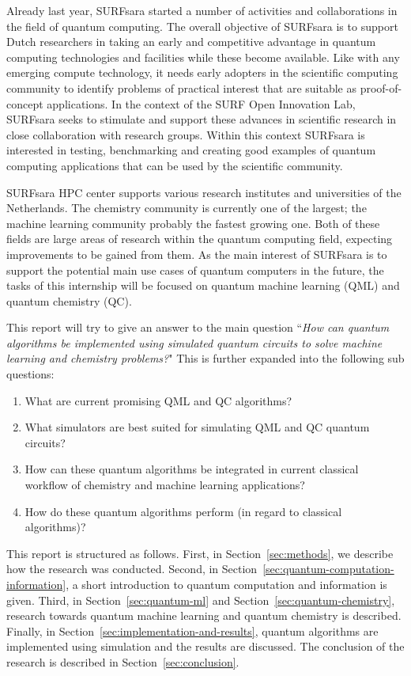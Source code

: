 \documentclass[a4paper,10pt]{article}
\begin{document}
Already last year, SURFsara started a number of activities and collaborations in the field of quantum computing.
The overall objective of SURFsara is to support Dutch researchers in taking an early and competitive advantage in quantum computing technologies and facilities while these become available.
Like with any emerging compute technology, it needs early adopters in the scientific computing community to identify problems of practical interest that are suitable as proof-of-concept applications.
In the context of the SURF Open Innovation Lab, SURFsara seeks to stimulate and support these advances in scientific research in close collaboration with research groups.
Within this context SURFsara is interested in testing, benchmarking and creating good examples of quantum computing applications that can be used by the scientific community.

SURFsara HPC center supports various research institutes and universities of the Netherlands.
The chemistry community is currently one of the largest; the machine learning community probably the fastest growing one.
Both of these fields are large areas of research within the quantum computing field, expecting improvements to be gained from them.
As the main interest of SURFsara is to support the potential main use cases of quantum computers in the future, the tasks of this internship will be focused on quantum machine learning (QML) and quantum chemistry (QC).

This report will try to give an answer to the main question ``\emph{How can quantum algorithms be implemented using simulated quantum circuits to solve machine learning and chemistry problems?}"
This is further expanded into the following sub questions:
\begin{enumerate}
	\item What are current promising QML and QC algorithms?
	\item What simulators are best suited for simulating QML and QC quantum circuits?
	\item How can these quantum algorithms be integrated in current classical workflow of chemistry and machine learning applications?
	\item How do these quantum algorithms perform (in regard to classical algorithms)?
\end{enumerate}

This report is structured as follows. First, in Section~\ref{sec:methods}, we describe how the research was conducted.
Second, in Section~\ref{sec:quantum-computation-information}, a short introduction to quantum computation and information is given.
Third, in Section~\ref{sec:quantum-ml} and Section~\ref{sec:quantum-chemistry}, research towards quantum machine learning and quantum chemistry is described.
Finally, in Section~\ref{sec:implementation-and-results}, quantum algorithms are implemented using simulation and the results are discussed.
The conclusion of the research is described in Section~\ref{sec:conclusion}.
\end{document}
